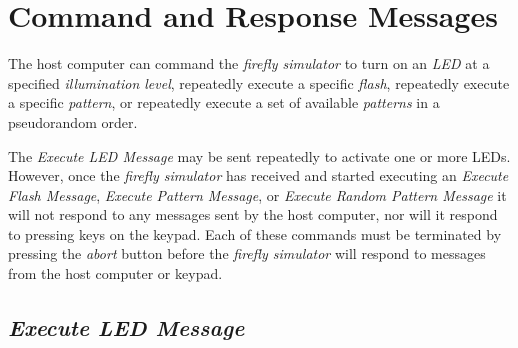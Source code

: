 \documentclass[letterpaper,11pt]{article}
\begin{document}

\section{Command and Response Messages}

The host computer can command the \textit{firefly simulator} to turn on an
\textit{LED} at a specified \textit{illumination level}, repeatedly execute a
specific \textit{flash}, repeatedly execute a specific \textit{pattern}, or
repeatedly execute a set of available \textit{patterns} in a pseudorandom order.

The \textit{Execute LED Message} may be sent repeatedly to activate one or
more LEDs. However, once the \textit{firefly simulator} has received and started
executing an \textit{Execute Flash Message}, \textit{Execute Pattern Message},
or \textit{Execute Random Pattern Message} it will not respond to any messages
sent by the host computer, nor will it respond to pressing keys on the keypad.
Each of these commands must be terminated by pressing the \textit{abort} button
before the \textit{firefly simulator} will respond to messages from the host
computer or keypad.

\subsection{\textit{Execute LED Message}}
\end{document}
